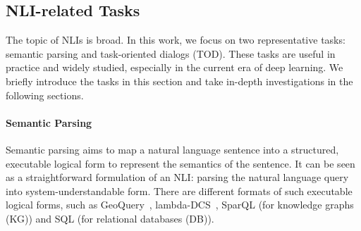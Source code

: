 \documentclass[11pt,dvipdfm]{article}
\begin{document}

\subsection{NLI-related Tasks}
The topic of NLIs is broad.
In this work, we 
focus on two representative tasks: semantic parsing and task-oriented dialogs (TOD). These tasks are useful in practice and widely studied, especially in the current era of deep learning. We briefly introduce the tasks in this section and take in-depth investigations in the following sections.


\paragraph{Semantic Parsing}
Semantic parsing aims to map a natural language sentence into a structured, executable logical form to represent the semantics of the sentence. It can be seen as a straightforward formulation of an NLI: parsing the natural language query into system-understandable form.
There are different formats of such executable logical forms, such as GeoQuery~\cite{GeoQuery:Zelle1996LearningTP},
lambda-DCS~\cite{WTQ}, SparQL (for knowledge graphs (KG)) and SQL (for relational databases (DB)).


\end{document}
